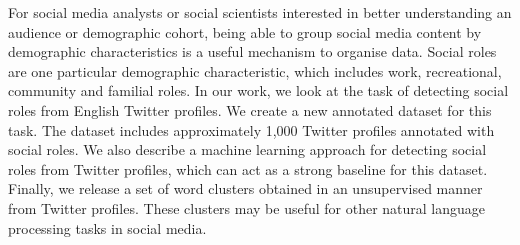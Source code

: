 For social media analysts or social scientists interested in better understanding an audience or demographic cohort, being able to group social media content by demographic characteristics is a useful mechanism to organise data. Social roles are one particular demographic characteristic, which includes work, recreational, community and familial roles. In our work, we look at the task of detecting social roles from English Twitter profiles. We create a new annotated dataset for this task. The dataset includes approximately 1,000 Twitter profiles annotated with social roles. We also describe a machine learning approach for detecting social roles from Twitter profiles, which can act as a strong baseline for this dataset. Finally, we release a set of word clusters obtained in an unsupervised manner from Twitter profiles. These clusters may be useful for other natural language processing tasks in social media.
